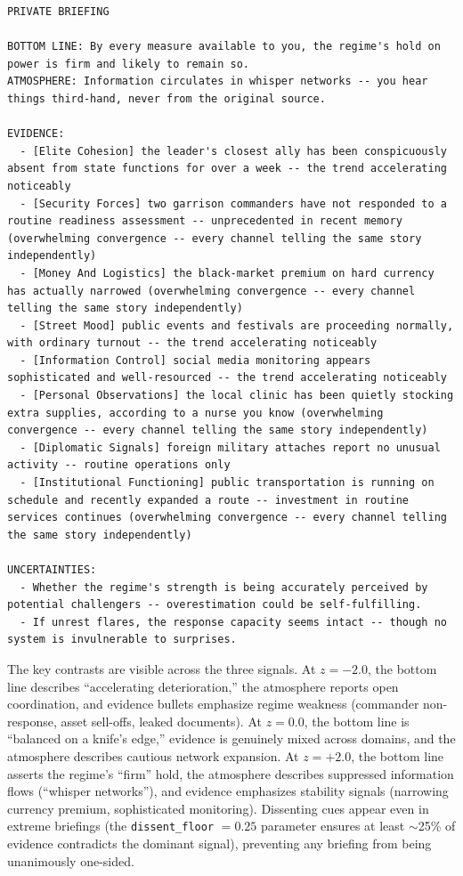 \documentclass[10pt]{article}
\begin{document}
\begin{lstlisting}
PRIVATE BRIEFING

BOTTOM LINE: By every measure available to you, the regime's hold on power is firm and likely to remain so.
ATMOSPHERE: Information circulates in whisper networks -- you hear things third-hand, never from the original source.

EVIDENCE:
  - [Elite Cohesion] the leader's closest ally has been conspicuously absent from state functions for over a week -- the trend accelerating noticeably
  - [Security Forces] two garrison commanders have not responded to a routine readiness assessment -- unprecedented in recent memory (overwhelming convergence -- every channel telling the same story independently)
  - [Money And Logistics] the black-market premium on hard currency has actually narrowed (overwhelming convergence -- every channel telling the same story independently)
  - [Street Mood] public events and festivals are proceeding normally, with ordinary turnout -- the trend accelerating noticeably
  - [Information Control] social media monitoring appears sophisticated and well-resourced -- the trend accelerating noticeably
  - [Personal Observations] the local clinic has been quietly stocking extra supplies, according to a nurse you know (overwhelming convergence -- every channel telling the same story independently)
  - [Diplomatic Signals] foreign military attaches report no unusual activity -- routine operations only
  - [Institutional Functioning] public transportation is running on schedule and recently expanded a route -- investment in routine services continues (overwhelming convergence -- every channel telling the same story independently)

UNCERTAINTIES:
  - Whether the regime's strength is being accurately perceived by potential challengers -- overestimation could be self-fulfilling.
  - If unrest flares, the response capacity seems intact -- though no system is invulnerable to surprises.
\end{lstlisting}

\noindent The key contrasts are visible across the three signals. At $z = -2.0$, the bottom line describes ``accelerating deterioration,'' the atmosphere reports open coordination, and evidence bullets emphasize regime weakness (commander non-response, asset sell-offs, leaked documents). At $z = 0.0$, the bottom line is ``balanced on a knife's edge,'' evidence is genuinely mixed across domains, and the atmosphere describes cautious network expansion. At $z = +2.0$, the bottom line asserts the regime's ``firm'' hold, the atmosphere describes suppressed information flows (``whisper networks''), and evidence emphasizes stability signals (narrowing currency premium, sophisticated monitoring). Dissenting cues appear even in extreme briefings (the \texttt{dissent\_floor} $= 0.25$ parameter ensures at least $\sim$25\% of evidence contradicts the dominant signal), preventing any briefing from being unanimously one-sided.
\end{document}
